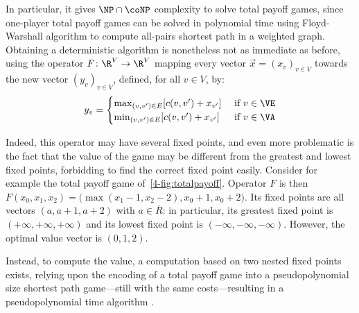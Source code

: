 In particular, it gives $\NP\cap\coNP$ complexity to solve
total payoff games, since one-player total payoff games can be solved
in polynomial time using Floyd-Warshall algorithm to compute all-pairs
shortest path in a weighted graph. Obtaining a deterministic algorithm
is nonetheless not as immediate as before, using the operator
$F\colon \R^V\to \R^V$ mapping every vector $\vec x=(x_v)_{v\in V}$
towards the new vector $(y_v)_{v\in V}$, defined, for all $v\in V$,
by:
\[y_v =
  \begin{cases}
    \max_{(v,v')\in E} [c(v,v') + x_{v'}] &
    \text{ if } v\in \VE\\
    \min_{(v,v')\in E} [c(v,v') + x_{v'}] & \text{ if } v\in \VA
  \end{cases}\]

Indeed, this operator may have several fixed points, and even more
problematic is the fact that the value of the game may be different
from the greatest and lowest fixed points, forbidding to find the
correct fixed point easily. Consider for example the total payoff game
of~\cref{4-fig:totalpayoff}. Operator $F$ is then
$F(x_0,x_1,x_2) = \big(\max(x_1-1,x_2-2),x_0+1,x_0+2\big)$. Its fixed
points are all vectors $(a,a+1,a+2)$ with $a\in \overline R$: in
particular, its greatest fixed point is $(+\infty, +\infty, +\infty)$
and its lowest fixed point is $(-\infty, -\infty, -\infty)$. However,
the optimal value vector is $(0,1,2)$.

Instead, to compute the value, a computation based on two nested fixed
points exists, relying upon the encoding of a total payoff game into a
pseudopolynomial size shortest path game---still with the same
costs---resulting in a pseudopolynomial time algorithm \cite{Brihaye&Geeraerts&HaddadA&Monmege:2017}.

